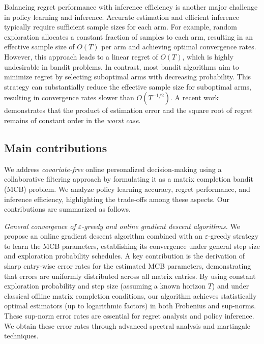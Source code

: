 \documentclass[12pt]{article}
\def\eps{\varepsilon}
\theoremstyle{plain}
\begin{document}
Balancing regret performance with inference efficiency is another major challenge in policy learning and inference. Accurate estimation and efficient inference typically require sufficient sample sizes for each arm. For example, random exploration allocates a constant fraction of samples to each arm, resulting in an effective sample size of $O(T)$ per arm and achieving optimal convergence rates. However, this approach leads to a linear regret of $O(T)$, which is highly undesirable in bandit problems. In contrast, most bandit algorithms aim to minimize  regret by selecting suboptimal arms with decreasing probability. This strategy can substantially reduce the effective sample size for suboptimal arms, resulting in convergence rates slower than $O(T^{-1/2})$. A recent work \citet{simchi2023multi} demonstrates that the product of estimation error and the square root of regret remains of constant order in the \emph{worst case}.




\subsection{Main contributions}

We address \emph{covariate-free} online personalized decision-making using a collaborative filtering approach by formulating it as a matrix completion bandit (MCB) problem. We analyze policy learning accuracy, regret performance, and inference efficiency, highlighting the trade-offs among these aspects. Our contributions are summarized as follows. 

\emph{General convergence of $\eps$-greedy and online gradient descent algorithms.} We propose an online gradient descent algorithm combined with an $\varepsilon$-greedy strategy to learn the MCB parameters, establishing its convergence under general step size and exploration probability schedules. A key contribution is the derivation of sharp entry-wise error rates for the estimated MCB parameters, demonstrating that errors are uniformly distributed across all matrix entries. By using constant exploration probability and step size (assuming a known horizon $T$) and under classical offline matrix completion conditions, our algorithm achieves statistically optimal estimators (up to logarithmic factors) in both Frobenius and sup-norms. These sup-norm error rates are essential for regret analysis and policy inference. We obtain these error rates through advanced spectral analysis and martingale techniques.
\end{document}
